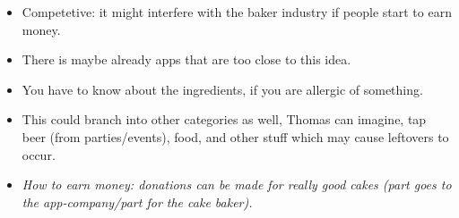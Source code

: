 \begin{multicols}{2}
{\begin{itemize}
	\item Competetive: it might interfere with the baker industry if people start to earn money.
	\item There is maybe already apps that are too close to this idea. 
	\item You have to know about the ingredients, if you are allergic of something.
	\item This could branch into other categories as well, Thomas can imagine, tap beer (from parties/events), food, and other stuff which may cause leftovers to occur.
	\item \textit{How to earn money: donations can be made for really good cakes (part goes to the app-company/part for the cake baker).}
\end{itemize}
}
\end{multicols}